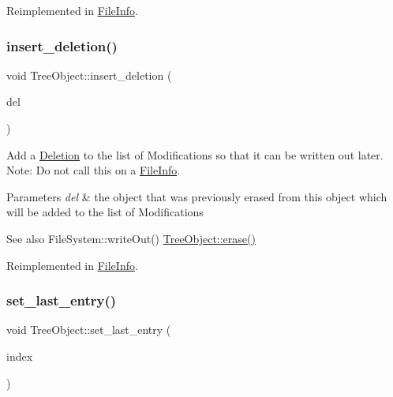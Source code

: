 Reimplemented in \mbox{\hyperlink{classFileInfo_a7f788f31521c535646eebfa9959bbb24}{File\+Info}}.

\mbox{\label{classTreeObject_afcc4b3928d2b77ff080aa229a9706215}} 
\subsubsection{\texorpdfstring{insert\+\_\+deletion()}{insert\_deletion()}}
{\footnotesize\ttfamily void Tree\+Object\+::insert\+\_\+deletion (\begin{DoxyParamCaption}\item[{\mbox{\hyperlink{classTreeObject}{Tree\+Object}} $\ast$}]{del }\end{DoxyParamCaption})\hspace{0.3cm}{\ttfamily [virtual]}}

Add a \mbox{\hyperlink{classDeletion}{Deletion}} to the list of Modifications so that it can be written out later. Note\+: Do not call this on a \mbox{\hyperlink{classFileInfo}{File\+Info}}. 
\begin{DoxyParams}{Parameters}
{\em del} & the object that was previously erased from this object which will be added to the list of Modifications \\
\hline
\end{DoxyParams}
\begin{DoxySeeAlso}{See also}
File\+System\+::write\+Out() \mbox{\hyperlink{classTreeObject_a453b5df2a9ef7c6faad259900d574ee2}{Tree\+Object\+::erase()}} 
\end{DoxySeeAlso}


Reimplemented in \mbox{\hyperlink{classFileInfo_a278136b1d68f55dc56a4be807076fc0d}{File\+Info}}.

\mbox{\label{classTreeObject_a2ec94bc9d2647275049ddf2a70b8510e}} 
\subsubsection{\texorpdfstring{set\+\_\+last\+\_\+entry()}{set\_last\_entry()}}
{\footnotesize\ttfamily void Tree\+Object\+::set\+\_\+last\+\_\+entry (\begin{DoxyParamCaption}\item[{\mbox{\hyperlink{structindex}{Index}}}]{index }\end{DoxyParamCaption})}

